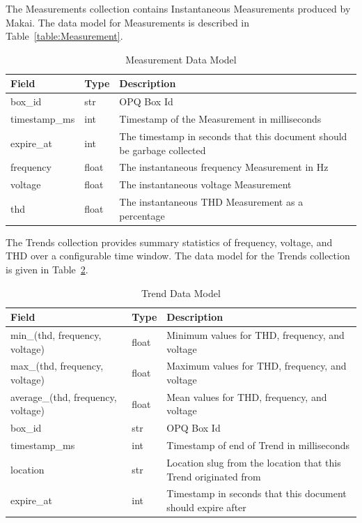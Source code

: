 The Measurements collection contains Instantaneous Measurements produced by Makai. The data model for Measurements is described in Table~\ref{table:Measurement}.

\begin{table}[H]
	\centering
	\caption{Measurement Data Model}
	\begin{tabularx}{\textwidth}{llX}
		\toprule
		\textbf{Field} & \textbf{Type} & \textbf{Description} \\
		\midrule
		box\_id & str & OPQ Box Id \\
		timestamp\_ms & int & Timestamp of the Measurement in milliseconds \\
		expire\_at & int & The timestamp in seconds that this document should be garbage collected \\
		frequency & float & The instantaneous frequency Measurement in Hz \\
		voltage & float & The instantaneous voltage Measurement \\
		thd & float & The instantaneous THD Measurement as a percentage \\
		\bottomrule
	\end{tabularx}
	\label{table:Measurements}
\end{table}

The Trends collection provides summary statistics of frequency, voltage, and THD over a configurable time window. The data model for the Trends collection is given in Table~\ref{table:Trends}.

\begin{table}[H]
	\centering
	\caption{Trend Data Model}
	\begin{tabularx}{\textwidth}{XlX}
		\toprule
		\textbf{Field} & \textbf{Type} & \textbf{Description} \\
		\midrule
		min\_(thd, frequency, voltage) & float & Minimum values for THD, frequency, and voltage \\
		max\_(thd, frequency, voltage) & float & Maximum values for THD, frequency, and voltage \\
		average\_(thd, frequency, voltage) & float & Mean values for THD, frequency, and voltage \\
		box\_id & str & OPQ Box Id \\
		timestamp\_ms & int & Timestamp of end of Trend in milliseconds \\
		location & str & Location slug from the location that this Trend originated from \\
		expire\_at & int & Timestamp in seconds that this document should expire after \\
		\bottomrule
	\end{tabularx}
	\label{table:Trends}
\end{table}

